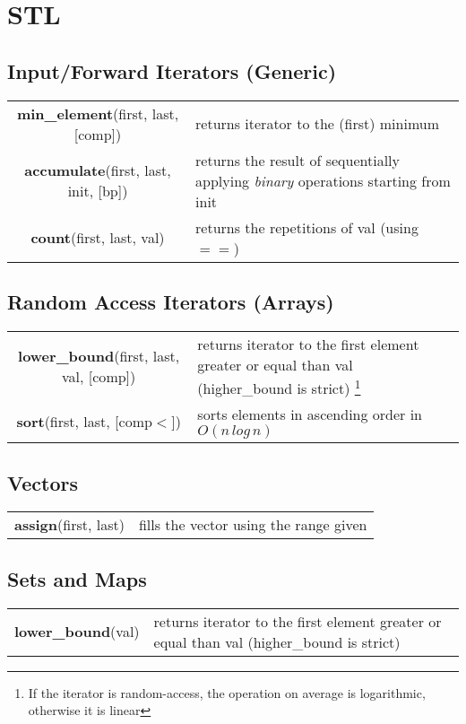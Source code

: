 \documentclass{article}
\begin{document}
\tableofcontents


\pagebreak


\section{STL}

{\centering \subsection*{Input/Forward Iterators (Generic)}}
\begin{tabularx}{\textwidth/2-20pt}{c X}
    \textbf{min\_element}(first, last, [comp]) & returns iterator to the (first) minimum \\
    \textbf{accumulate}(first, last, init, [bp]) & returns the result of sequentially applying \textit{binary} operations starting from init \\
    \textbf{count}(first, last, val) & returns the repetitions of val (using $==$)
\end{tabularx}

{\centering \subsection*{Random Access Iterators (Arrays)}}
\begin{tabularx}{\textwidth/2-20pt}{c X}
    \textbf{lower\_bound}(first, last, val, [comp]) & returns iterator to the first element greater or equal than val (higher\_bound is strict) \footnote{If the iterator is random-access, the operation on average is logarithmic, otherwise it is linear} \\
    \textbf{sort}(first, last, [comp$<$]) & sorts elements in ascending order in $O(n \, log \, n)$
\end{tabularx}

{\centering \subsection*{Vectors}}
\begin{tabularx}{\textwidth/2-20pt}{c X}
    \textbf{assign}(first, last) & fills the vector using the range given \\
\end{tabularx}

{\centering \subsection*{Sets and Maps}}
\begin{tabularx}{\textwidth/2-20pt}{c X}
    \textbf{lower\_bound}(val) & returns iterator to the first element greater or equal than val (higher\_bound is strict)
\end{tabularx}
\end{document}
